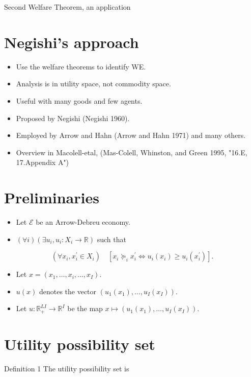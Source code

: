 \documentclass[10pt]{article}
\begin{document}
\captionsetup{singlelinecheck=false}
Second Welfare Theorem, an application

\section*{Negishi's approach}
\begin{itemize}
  \item Use the welfare theorems to identify WE.
  \item Analysis is in utility space, not commodity space.
  \item Useful with many goods and few agents.
  \item Proposed by Negishi (Negishi 1960).
  \item Employed by Arrow and Hahn (Arrow and Hahn 1971) and many others.
  \item Overview in Macolell-etal, (Mas-Colell, Whinston, and Green 1995, "16.E, 17.Appendix A")
\end{itemize}

\section*{Preliminaries}
\begin{itemize}
  \item Let $\mathcal{E}$ be an Arrow-Debreu economy.
  \item $(\forall i)\left(\exists u_{i}, u_{i}: X_{i} \rightarrow \mathbb{R}\right)$ such that
\end{itemize}

$$
\left(\forall x_{i}, x_{i}^{\prime} \in X_{i}\right) \quad\left[x_{i} \succeq_{i} x_{i}^{\prime} \Longleftrightarrow u_{i}\left(x_{i}\right) \geq u_{i}\left(x_{i}^{\prime}\right)\right] .
$$

\begin{itemize}
  \item Let $x=\left(x_{1}, \ldots, x_{i}, \ldots, x_{I}\right)$.
  \item $u(x)$ denotes the vector $\left(u_{1}\left(x_{1}\right), \ldots, u_{I}\left(x_{I}\right)\right)$.
  \item Let $u: \mathbb{R}_{+}^{L I} \rightarrow \mathbb{R}^{I}$ be the map $x \mapsto\left(u_{1}\left(x_{1}\right), \ldots, u_{I}\left(x_{I}\right)\right)$.
\end{itemize}

\section*{Utility possibility set}
Definition 1 The utility possibility set is
\end{document}

